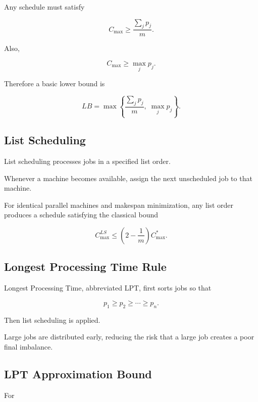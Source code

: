 Any schedule must satisfy

\[
\boxed{
C_{\max}
\geq
\frac{
\sum_jp_j
}{
m
}.
}
\]

Also,

\[
\boxed{
C_{\max}
\geq
\max_jp_j.
}
\]

Therefore a basic lower bound is

\[
\boxed{
LB
=
\max
\left\{
\frac{\sum_jp_j}{m},
\;
\max_jp_j
\right\}.
}
\]

\subsection{List Scheduling}
\label{subsec:list-scheduling}

List scheduling processes jobs in a specified list order.

Whenever a machine becomes available, assign the next unscheduled job to
that machine.

For identical parallel machines and makespan minimization, any list order
produces a schedule satisfying the classical bound

\[
\boxed{
C_{\max}^{LS}
\leq
\left(
2-\frac1m
\right)
C_{\max}^*.
}
\]

\subsection{Longest Processing Time Rule}
\label{subsec:lpt-rule}

Longest Processing Time, abbreviated LPT, first sorts jobs so that

\[
\boxed{
p_1
\geq
p_2
\geq
\cdots
\geq
p_n.
}
\]

Then list scheduling is applied.

Large jobs are distributed early, reducing the risk that a large job
creates a poor final imbalance.

\subsection{LPT Approximation Bound}
\label{subsec:lpt-approximation-bound}

For

